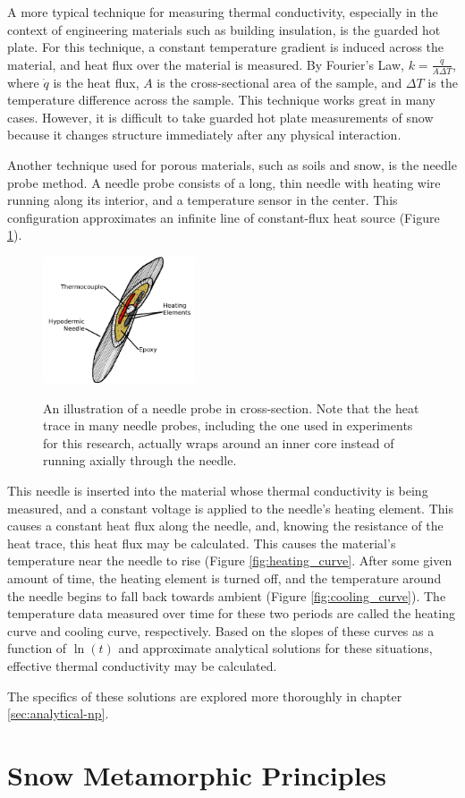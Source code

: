 A more typical technique for measuring thermal conductivity, especially in the
context of engineering materials such as building insulation, is the guarded
hot plate. For this technique, a constant temperature gradient is induced across
the material, and heat flux over the material is measured.  By Fourier's Law,
\(k = \frac{\dot{q}}{A\Delta T}\), where \(\dot{q}\) is the heat flux, \(A\) is
the cross-sectional area of the sample, and \(\Delta T\) is the temperature
difference across the sample. This technique works great in many cases. However, it is difficult to take
guarded hot plate measurements of snow because it changes structure immediately
after any physical interaction.

Another technique used for porous materials, such as soils and snow, is the
needle probe method. A needle probe consists of a long, thin needle with heating
wire running along its interior, and a temperature sensor in the center. This
configuration approximates an infinite line of constant-flux heat source
(Figure \ref{fig:needle_xsect}).

\begin{figure}[h]
\centering
\includegraphics[width=0.4\textwidth]{fig/needle_xsect.png}
\label{fig:needle_xsect}
\caption{An illustration of a needle probe in cross-section. Note that the heat
trace in many needle probes, including the one used in experiments for this
research, actually wraps around an inner core instead of running axially through
the needle.}
\end{figure}

This needle is inserted into the material whose thermal conductivity is being
measured, and a constant voltage is applied to the needle's heating element.
This causes a constant heat flux along the needle, and, knowing the resistance
of the heat trace, this heat flux may be calculated. This causes the material's
temperature near the needle to rise (Figure \ref{fig:heating_curve}. After some
given amount of time, the heating element is turned off, and the temperature
around the needle begins to fall back towards ambient (Figure \ref{fig:cooling_curve}).
The temperature data measured over time for these two periods are called the
heating curve and cooling curve, respectively.  Based on the slopes of these
curves as a function of \(\ln(t)\) and approximate analytical solutions for
these situations, effective thermal conductivity may be calculated.

The specifics of these solutions are explored more thoroughly in chapter
\ref{sec:analytical-np}.

\section{Snow Metamorphic Principles}
\label{sec:introduction:metamorphic}
